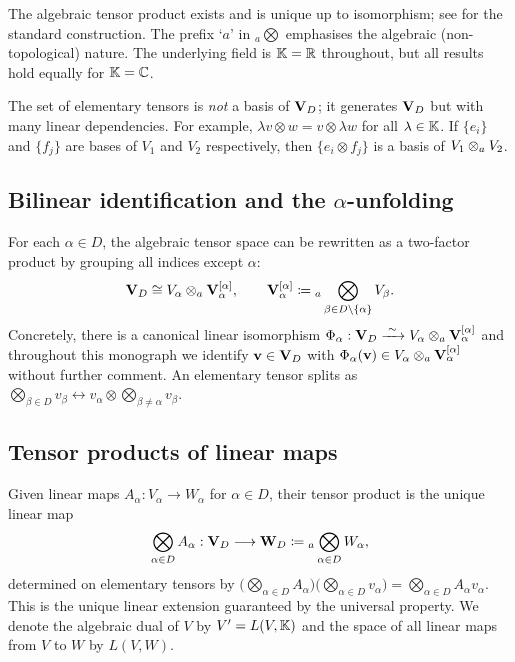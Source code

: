 The algebraic tensor product exists and is unique up to isomorphism; see
\cite{Greub1981} for the standard construction. The prefix `$a$' in
${}_a\bigotimes$ emphasises the algebraic (non-topological) nature.
The underlying field is $\mathbb{K} = \mathbb{R}$ throughout, but all results hold
equally for $\mathbb{K} = \mathbb{C}$.

\begin{remark}
\label{rem:tensor_not_basis}
The set of elementary tensors is \emph{not} a basis of $\mathbf{V}_D$; it
generates $\mathbf{V}_D$ but with many linear dependencies. For example,
$\lambda v \otimes w = v \otimes \lambda w$ for all $\lambda \in \mathbb{K}$.
If $\{e_i\}$ and $\{f_j\}$ are bases of $V_1$ and $V_2$ respectively,
then $\{e_i \otimes f_j\}$ is a basis of $V_1 \otimes_a V_2$.
\end{remark}

\subsection*{Bilinear identification and the $\alpha$-unfolding}

For each $\alpha \in D$, the algebraic tensor space can be rewritten as
a two-factor product by grouping all indices except $\alpha$:
\begin{equation}
\label{eq:bilinear_split}
    \mathbf{V}_D \cong V_\alpha \otimes_a \mathbf{V}_\alpha^{[\alpha]},
    \qquad
    \mathbf{V}_\alpha^{[\alpha]} \coloneqq {}_a\bigotimes_{\beta \in D \setminus \{\alpha\}} V_\beta.
\end{equation}
Concretely, there is a canonical linear isomorphism
$\Phi_\alpha: \mathbf{V}_D \xrightarrow{\;\sim\;} V_\alpha \otimes_a \mathbf{V}_\alpha^{[\alpha]}$
and throughout this monograph we identify $\mathbf{v} \in \mathbf{V}_D$ with
$\Phi_\alpha(\mathbf{v}) \in V_\alpha \otimes_a \mathbf{V}_\alpha^{[\alpha]}$ without
further comment. An elementary tensor splits as
$\bigotimes_{\beta \in D} v_\beta \leftrightarrow v_\alpha \otimes
\bigotimes_{\beta \neq \alpha} v_\beta$.

\subsection*{Tensor products of linear maps}

Given linear maps $A_\alpha: V_\alpha \to W_\alpha$ for $\alpha \in D$,
their tensor product is the unique linear map
\begin{equation}
\label{eq:tensor_of_maps}
    \bigotimes_{\alpha \in D} A_\alpha :
    \mathbf{V}_D \longrightarrow \mathbf{W}_D
    \coloneqq {}_a\bigotimes_{\alpha \in D} W_\alpha,
\end{equation}
determined on elementary tensors by
$\bigl(\bigotimes_{\alpha \in D} A_\alpha\bigr)
\bigl(\bigotimes_{\alpha \in D} v_\alpha\bigr)
= \bigotimes_{\alpha \in D} A_\alpha v_\alpha$.
This is the unique linear extension guaranteed by the universal property.
We denote the algebraic dual of $V$ by $V' = L(V, \mathbb{K})$
and the space of all linear maps from $V$ to $W$ by $L(V, W)$.

